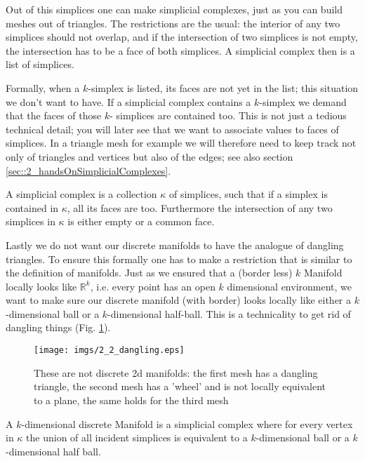 Out of this simplices one can make simplicial complexes, just as you can build meshes out of triangles. The restrictions are the usual: the interior of any two simplices should not overlap, and if the intersection of two simplices is not empty, the intersection has to be a face of both simplices.  A simplicial complex then is a list of simplices. 

Formally, when a $k$-simplex is listed, its faces are not yet in the list; this situation we don't want to have. If a simplicial complex contains a  $k$-simplex we demand that the faces of those $k$- simplices are contained too. This is not just a tedious technical detail; you will later see that we want to associate values to faces of simplices. In a triangle mesh for example we will therefore need to keep track not only of triangles and vertices but also of the edges; see also section \ref{sec::2_handsOnSimplicialComplexes}.

\begin{definition}
A simplicial  complex is a collection $\kappa$ of simplices, such that if a simplex is contained in $\kappa$, all its faces are too. Furthermore the intersection of any two simplices in  $\kappa$ is either empty or a common face.
\end{definition}

Lastly we do not want our discrete manifolds  to have the analogue of dangling triangles. To ensure this formally one has to make a restriction that is similar to the definition of manifolds. Just as we ensured that a (border less) $k$ Manifold locally looks like $\mathbb R^k$, i.e. every point has an open $k$ dimensional environment, we want to make sure our discrete manifold (with border) looks locally like either a $k$-dimensional ball or a $k$-dimensional half-ball. This is a technicality to get rid of dangling things (Fig. \ref{fig::2_2_dangling}).

\begin{figure}
\begin{center}
\texttt{[image: imgs/2\_2\_dangling.eps]}
\caption{These are not discrete 2d manifolds: the first mesh has a dangling triangle, the second mesh has a 'wheel' and is not locally equivalent to a plane, the same holds for the third mesh}
\label{fig::2_2_dangling}
\end{center}
\end{figure}

\begin{definition}
A $k$-dimensional discrete Manifold is a simplicial complex where for every vertex in $\kappa$ the union of all incident simplices is equivalent to a $k$-dimensional ball or a $k$-dimensional half ball.
\end{definition} 


